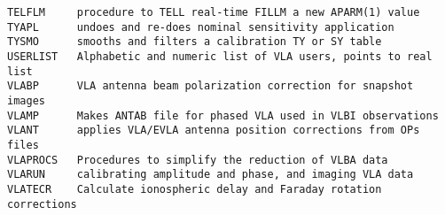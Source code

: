\begin{verbatim}
TELFLM     procedure to TELL real-time FILLM a new APARM(1) value
TYAPL      undoes and re-does nominal sensitivity application
TYSMO      smooths and filters a calibration TY or SY table
USERLIST   Alphabetic and numeric list of VLA users, points to real list
VLABP      VLA antenna beam polarization correction for snapshot images
VLAMP      Makes ANTAB file for phased VLA used in VLBI observations
VLANT      applies VLA/EVLA antenna position corrections from OPs files
VLAPROCS   Procedures to simplify the reduction of VLBA data
VLARUN     calibrating amplitude and phase, and imaging VLA data
VLATECR    Calculate ionospheric delay and Faraday rotation corrections
\end{verbatim}\eve

\vfill\eject
{}

